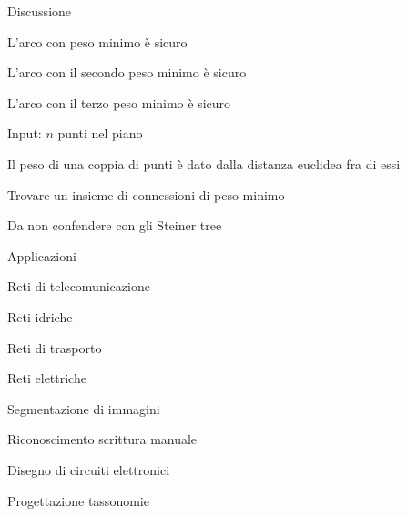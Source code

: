 \begin{frame}{Discussione}

\vspace{-9pt}
\begin{myboxtitle}
\BI
\item L’arco con peso minimo è sicuro
\item L’arco con il secondo peso minimo è sicuro
\item L’arco con il terzo peso minimo è sicuro
\EI
\end{myboxtitle}

\begin{myboxtitle}
\BI
\item Input: $n$ punti nel piano 
\item Il peso di una coppia di punti è dato dalla distanza euclidea fra di essi
\item Trovare un insieme di connessioni di peso minimo
\item Da non confendere con gli \alert{Steiner tree}
\EI
\end{myboxtitle}

\end{frame}

\begin{frame}{Applicazioni}

\vspace{-9pt}
\begin{myboxtitle}
\BI
\item Reti di telecomunicazione
\item Reti idriche
\item Reti di trasporto
\item Reti elettriche
\EI
\end{myboxtitle}

\begin{myboxtitle}
\BI
\item Segmentazione di immagini
\item Riconoscimento scrittura manuale
\item Disegno di circuiti elettronici
\item Progettazione tassonomie
\EI
\end{myboxtitle}

\end{frame}


